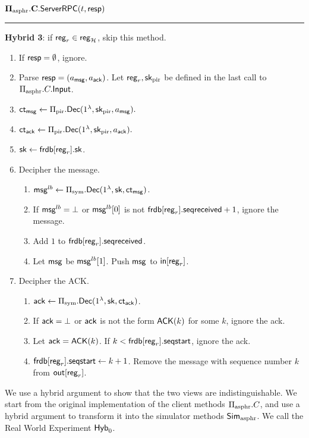 \vspace{10pt}
$\mathbf{\Pi_{\text{asphr}}.C.\mathsf{ServerRPC}}(t, \mathsf{resp})$
\vspace{5pt}
\hrule
\vspace{5pt}
{\color{red} \textbf{Hybrid 3}: if $\mathsf{reg}_r \in \mathsf{reg}_{\mathcal{H}}$, skip this method.}
\begin{enumerate}
    \item If $\mathsf{resp} = \emptyset$, ignore.
    \item Parse $\mathsf{resp} = (a_{\mathsf{msg}}, a_{\mathsf{ack}})$. Let $\mathsf{reg}_r, {\mathsf{sk}}_{\text{pir}}$ be defined in the last call to $\Pi_{\text{asphr}}.C.\mathsf{Input}$.
    \item $\mathsf{ct}_{\mathsf{msg}} \leftarrow \Pi_{\text{pir}}.\mathsf{Dec}(1^{\lambda}, {\mathsf{sk}}_{\text{pir}}, a_{\mathsf{msg}}).$
    \item $\mathsf{ct}_{\mathsf{ack}} \leftarrow \Pi_{\text{pir}}.\mathsf{Dec}(1^{\lambda}, {\mathsf{sk}}_{\text{pir}}, a_{\mathsf{ack}}).$
    \item ${\mathsf{sk}} \leftarrow \mathsf{frdb}[\mathsf{reg}_r].{\mathsf{sk}}$.
    \item Decipher the message.
    \begin{enumerate}
        \item $\mathsf{msg}^{lb} \leftarrow \Pi_{\text{sym}}.\mathsf{Dec}(1^{\lambda}, {\mathsf{sk}}, \mathsf{ct}_{\mathsf{msg}})$.
        \item If $\mathsf{msg}^{lb} = \bot$ or $\mathsf{msg}^{lb}[0]$ is not $\mathsf{frdb}[\mathsf{reg}_r].\mathsf{seqreceived} + 1$, ignore the message.
        \item Add $1$ to $\mathsf{frdb}[\mathsf{reg}_r].\mathsf{seqreceived}$. 
        \item Let $\mathsf{msg}$ be $\mathsf{msg}^{lb}[1]$. Push $\mathsf{msg}$ to $\mathsf{in}[\mathsf{reg}_r]$.
    \end{enumerate}
    \item Decipher the ACK.
    \begin{enumerate}
        \item $\mathsf{ack} \leftarrow \Pi_{\text{sym}}.\mathsf{Dec}(1^{\lambda}, {\mathsf{sk}}, \mathsf{ct}_{\mathsf{ack}})$.
        \item If $\mathsf{ack} = \bot$ or $\mathsf{ack}$ is not the form $\mathsf{ACK}(k)$ for some $k$, ignore the ack.
        \item Let $\mathsf{ack} = \mathsf{ACK}(k)$. If $k < \mathsf{frdb}[\mathsf{reg}_r].\mathsf{seqstart}$, ignore the ack.
        \item $\mathsf{frdb}[\mathsf{reg}_r].\mathsf{seqstart} \leftarrow k + 1$. Remove the message with sequence number $k$ from $\mathsf{out}[\mathsf{reg}_r]$.
    \end{enumerate}
\end{enumerate}

We use a hybrid argument to show that the two views are indistinguishable. We start from the original implementation of the client methods $\Pi_{\text{asphr}}.C$, and use a hybrid argument to transform it into the simulator methods $\mathsf{Sim}_{\text{asphr}}$. We call the Real World Experiment $\mathsf{Hyb}_0$.  

